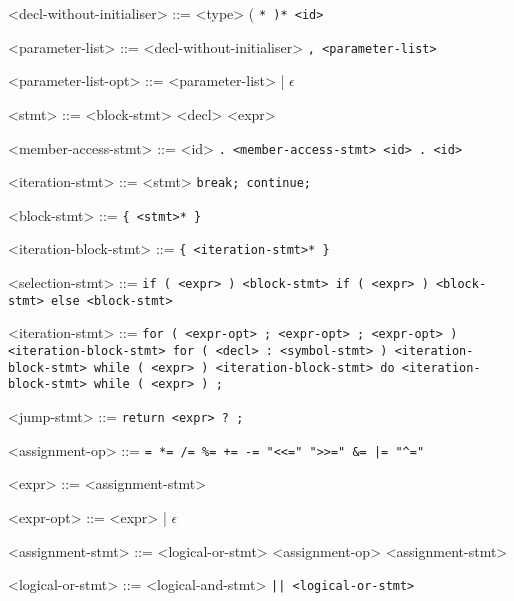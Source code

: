 \begin{grammar}
        <decl-without-initialiser> ::= <type> ( \tt{*} )* <id>

        <parameter-list> ::= <decl-without-initialiser> \tt{,} <parameter-list>

        <parameter-list-opt> ::= <parameter-list> | $\epsilon$

        <stmt> ::= <block-stmt>
        \alt <decl>
        \alt <expr>
        
        <member-access-stmt> ::= <id> \tt{.} <member-access-stmt>
        \alt <id> \tt{.} <id>

        <iteration-stmt> ::= <stmt>
        \alt \tt{break};
        \alt \tt{continue};
        
        <block-stmt> ::= \tt{\{} <stmt>* \tt{\}}
        
        <iteration-block-stmt> ::= \tt{\{} <iteration-stmt>* \tt{\}}

        <selection-stmt> ::= \tt{if} \tt{(} <expr> \tt{)} <block-stmt>
        \alt \tt{if} \tt{(} <expr> \tt{)} <block-stmt> \tt{else} <block-stmt>

        <iteration-stmt> ::= \tt{for} \tt{(} <expr-opt> \tt{;} <expr-opt> \tt{;} <expr-opt> \tt{)} <iteration-block-stmt>
        \alt \tt{for} \tt{(} <decl> \tt{:} <symbol-stmt> \tt{)} <iteration-block-stmt>
        \alt \tt{while} \tt{(} <expr> \tt{)} <iteration-block-stmt>
        \alt \tt{do} <iteration-block-stmt> \tt{while} \tt{(} <expr> \tt{)} \tt{;}

        <jump-stmt> ::= \tt{return} <expr> ? \tt{;}

        <assignment-op> ::= \tt{=}
        \alt \tt{*=}
        \alt \tt{/=}
        \alt \tt{\%=}
        \alt \tt{+=}
        \alt \tt{-=}
        \alt \tt{"<<="}
        \alt \tt{">>="}
        \alt \tt{\&=}
        \alt \tt{|=}
        \alt \tt{"^="}

        <expr> ::= <assignment-stmt>

        <expr-opt> ::= <expr> | $\epsilon$

        <assignment-stmt> ::= <logical-or-stmt>
         <assignment-op> <assignment-stmt>

        <logical-or-stmt> ::= <logical-and-stmt>
         \tt{||} <logical-or-stmt>


\end{grammar}
